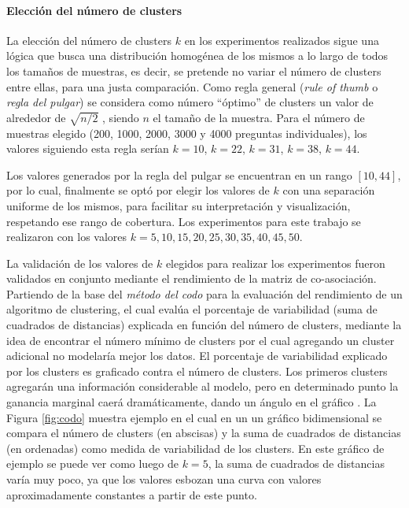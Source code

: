 \paragraph{Elección del número de clusters}
La elección del número de clusters \(k\) en los experimentos realizados sigue una lógica que busca una distribución homogénea de los mismos a lo largo de todos los tamaños de muestras, es decir, se pretende no variar el número de clusters entre ellas, para una justa comparación. Como regla general (\textit{rule of thumb} o \textit{regla del pulgar}) se considera como número ``óptimo'' de clusters un valor de alrededor de \(\sqrt{n/2}\) \citep{kodinariya2013review}, siendo \(n\) el tamaño de la muestra. Para el número de muestras elegido (200, 1000, 2000, 3000 y 4000 preguntas individuales), los valores siguiendo esta regla serían \(k = 10\), \(k = 22\), \(k = 31\), \(k = 38\), \(k =44\).

\bigskip Los valores generados por la regla del pulgar se encuentran en un rango \([10, 44]\), por lo cual, finalmente se optó por elegir los valores de \(k\) con una separación uniforme de los mismos, para facilitar su interpretación y visualización, respetando ese rango de cobertura. Los experimentos para este trabajo se realizaron con los valores \(k = 5, 10, 15, 20, 25, 30, 35, 40, 45, 50\).

\bigskip La validación de los valores de \(k\) elegidos para realizar los experimentos fueron validados en conjunto mediante el rendimiento de la matriz de co-asociación. Partiendo de la base del \textit{método del codo} para la evaluación del rendimiento de un algoritmo de clustering, el cual evalúa el porcentaje de variabilidad (suma de cuadrados de distancias) explicada en función del número de clusters, mediante la idea de encontrar el número mínimo de clusters por el cual agregando un cluster adicional no modelaría mejor los datos. El porcentaje de variabilidad explicado por los clusters es graficado contra el número de clusters. Los primeros clusters agregarán una información considerable al modelo, pero en determinado punto la ganancia marginal caerá dramáticamente, dando un ángulo en el gráfico \citep{bholowalia2014ebk}. La Figura \ref{fig:codo} muestra ejemplo en el cual en un un gráfico bidimensional se compara el número de clusters (en abscisas) y la suma de cuadrados de distancias (en ordenadas) como medida de variabilidad de los clusters. En este gráfico de ejemplo se puede ver como luego de \(k = 5\), la suma de cuadrados de distancias varía muy poco, ya que los valores esbozan una curva con valores aproximadamente constantes a partir de este punto.

